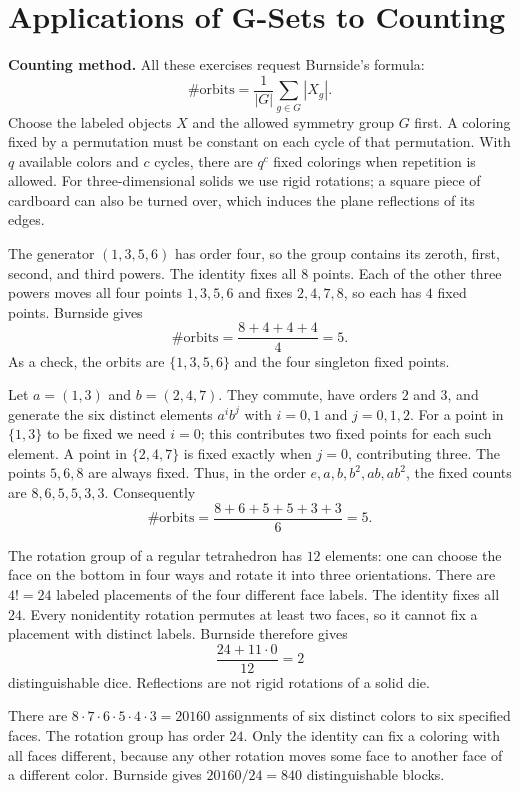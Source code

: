 \section{Applications of G-Sets to Counting}

\textbf{Counting method.} All these exercises request Burnside's formula:
\[
\#\text{orbits}=\frac1{|G|}\sum_{g\in G}|X_g|.
\]
Choose the labeled objects $X$ and the allowed symmetry group $G$ first.
A coloring fixed by a permutation must be constant on each cycle of that
permutation. With $q$ available colors and $c$ cycles, there are $q^c$
fixed colorings when repetition is allowed. For three-dimensional solids
we use rigid rotations; a square piece of cardboard can also be turned
over, which induces the plane reflections of its edges.

The generator $(1,3,5,6)$ has order four, so the group contains its zeroth,
first, second, and third powers. The identity fixes all $8$ points.
Each of the other three powers moves all four points $1,3,5,6$ and fixes
$2,4,7,8$, so each has $4$ fixed points. Burnside gives
\[
\#\text{orbits}=\frac{8+4+4+4}{4}=\boxed5.
\]
As a check, the orbits are $\{1,3,5,6\}$ and the four singleton fixed points.

Let $a=(1,3)$ and $b=(2,4,7)$. They commute, have orders $2$ and $3$,
and generate the six distinct elements $a^ib^j$ with $i=0,1$ and $j=0,1,2$.
For a point in $\{1,3\}$ to be fixed we need $i=0$; this contributes two
fixed points for each such element. A point in $\{2,4,7\}$ is fixed
exactly when $j=0$, contributing three. The points $5,6,8$ are always fixed.
Thus, in the order $e,a,b,b^2,ab,ab^2$, the fixed counts are
$8,6,5,5,3,3$. Consequently
\[
\#\text{orbits}=\frac{8+6+5+5+3+3}{6}=\boxed5.
\]

The rotation group of a regular tetrahedron has $12$ elements: one can
choose the face on the bottom in four ways and rotate it into three
orientations. There are $4!=24$ labeled placements of the four different
face labels. The identity fixes all $24$. Every nonidentity rotation
permutes at least two faces, so it cannot fix a placement with distinct
labels. Burnside therefore gives
\[
\frac{24+11\cdot0}{12}=\boxed2
\]
distinguishable dice. Reflections are not rigid rotations of a solid die.

There are $8\cdot7\cdot6\cdot5\cdot4\cdot3=20160$ assignments of six
distinct colors to six specified faces. The rotation group has order $24$.
Only the identity can fix a coloring with all faces different, because any
other rotation moves some face to another face of a different color.
Burnside gives $20160/24=\boxed{840}$ distinguishable blocks.

